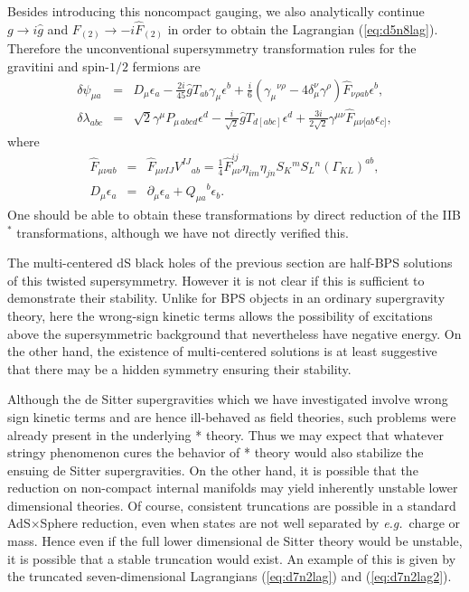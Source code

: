 \documentclass[a4paper,12pt]{article}
\newcommand{\fft}[2]{{\frac{#1}{#2}}}
\newcommand{\ft}[2]{{\textstyle\frac{#1}{#2}}}
\begin{document}
Besides introducing this noncompact gauging, we also analytically continue
$g\to i\hat g$ and $F_{(2)} \to -i\hat F_{(2)}$ in order to obtain the
Lagrangian (\ref{eq:d5n8lag}).  Therefore the unconventional supersymmetry
transformation rules for the gravitini and spin-$1/2$ fermions are 
%
\begin{eqnarray}
\delta\psi_{\mu a}&=&D_{\mu}\epsilon_a - \fft{2i}{45}\hat g
T_{ab}\gamma_{\mu}\epsilon^b +\fft{i}6 (\gamma_\mu{}^{\nu\rho}
-4\delta_\mu^\nu\gamma^{\rho})\hat F_{\nu\rho ab}\epsilon^b,\nonumber\\
\delta\lambda_{abc}&=&\sqrt{2}\gamma^{\mu}P_{\mu\, abcd}\epsilon^d
-\fft{i}{\sqrt{2}}\hat g T_{d[abc]}\epsilon^d 
+\fft{3i}{2\sqrt{2}}\gamma^{\mu\nu}\hat F_{\mu\nu [ab}\epsilon_{c]},
\end{eqnarray}
%
where 
%
\begin{eqnarray}
\hat F_{\mu\nu ab}&=&\hat F_{\mu\nu IJ}{V^{IJ}}_{ab}=
\ft14\hat F_{\mu\nu}^{ij}\eta_{im}\eta_{jn}S_K{}^mS_L{}^n(\Gamma_{KL})^{ab}
,\nonumber\\
D_{\mu}\epsilon_a&=&\partial_{\mu} \epsilon_a + {Q_{\mu a}}^b\epsilon_b.
\end{eqnarray}
%
One should be able to obtain these transformations by direct reduction of
the IIB$^*$ transformations, although we have not directly verified this.

The multi-centered dS black holes of the previous section are half-BPS
solutions of this twisted supersymmetry.  However it is not clear if this
is sufficient to demonstrate their stability.  Unlike for BPS objects in
an ordinary supergravity theory, here the wrong-sign kinetic terms allows
the possibility of excitations above the supersymmetric background that
nevertheless have negative energy.  On the other hand, the existence of
multi-centered solutions is at least suggestive that there may be a hidden
symmetry ensuring their stability.

Although the de Sitter supergravities which we have investigated involve
wrong sign kinetic terms and are hence ill-behaved as field theories,
such problems were already present in the underlying * theory.  Thus we
may expect that whatever stringy phenomenon cures the behavior of * theory
would also stabilize the ensuing de Sitter supergravities.  On the other
hand, it is possible that the reduction on non-compact internal
manifolds may yield inherently unstable lower dimensional theories.  Of
course, consistent truncations are possible in a standard AdS$\times$Sphere
reduction, even when states are not well separated by {\it e.g.}~charge
or mass.  Hence even if the full lower dimensional de Sitter theory would
be unstable, it is possible that a stable truncation would exist.  An
example of this is given by the truncated seven-dimensional Lagrangians
(\ref{eq:d7n2lag}) and (\ref{eq:d7n2lag2}).
\end{document}
